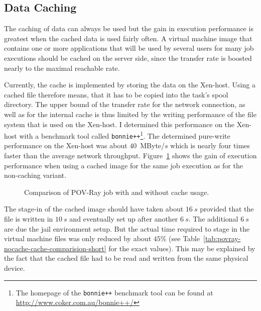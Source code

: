 \subsection{Data Caching}
\label{sec:data-caching}

The  caching  of  data can  always  be  used  but  the gain  in  execution
performance  is greatest  when the  cached data  is used  fairly  often. A
virtual machine image that contains  one or more applications that will be
used by  several users  for many  job executions should  be cached  on the
server  side, since the  transfer rate  is boosted  nearly to  the maximal
reachable  rate.

Currently,  the  cache   is  implemented  by  storing  the   data  on  the
Xen-host. Using  a cached file therefore  means, that it has  to be copied
into the task's spool directory. The  upper bound of the transfer rate for
the network connection, as well as  for the internal cache is thus limited
by  the  writing performance  of  the  file system  that  is  used on  the
Xen-host. I determined  this performance on the Xen-host  with a benchmark
tool    called     \texttt{bonnie++}\footnote{The    homepage    of    the
  \texttt{bonnie++}     benchmark     tool     can     be     found     at
  \url{http://www.coker.com.au/bonnie++/}}.   The   determined  pure-write
performance on the Xen-host was  about $40$~MByte/$s$ which is nearly four
times     faster     than      the     average     network     throughput.
Figure~\ref{fig:pov-cache-comparison-short}  shows the  gain  of execution
performance when  using a cached image  for the same job  execution as for
the non-caching variant.

\begin{figure}[ht]
  \caption[Not cached  \vs cached  images]{Comparison of POV-Ray  job with
    and without cache usage.}
  \label{fig:pov-cache-comparison-short}
\end{figure}

The stage-in of the cached image  should have taken about $16\ s$ provided
that the  file is written in $10\  s$ and eventually set  up after another
$6\ s$. The additional $6\ s$  are due the jail environment setup. But the
actual  time required  to  stage in  the  virtual machine  files was  only
reduced             by            about             $45\%$            (see
Table~\ref{tab:povray-nocache-cache-comparision-short}   for   the   exact
values). This may be explained by the  fact that the cached file had to be
read  and written  from  the  same physical  device.

